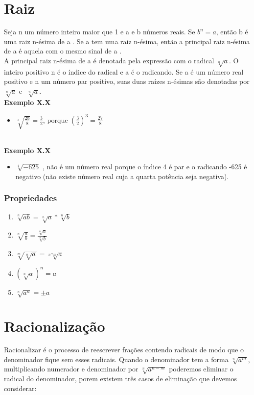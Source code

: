 \documentclass[a4paper,12pt,twoside,BCOR=10mm]{scrbook}
\begin{document}
\begin{titlepage}
\section{Raiz}
Seja n um número inteiro maior que 1 e a e b números reais.
Se $b^{n} = a$, então b é uma raiz n-ésima de a .
Se a tem uma raiz n-ésima, então a principal raiz n-ésima de a é aquela com o mesmo sinal de a .\\
A principal raiz n-ésima de a é denotada pela expressão com o radical $\sqrt[n]{a}$. O inteiro positivo n é o índice do radical e a é o radicando.
Se a é um número real positivo e n um número par positivo, suas duas raízes n-ésimas são denotadas por $\sqrt[n]{a}$ e -$\sqrt[n]{a}$.
\\
\textbf{Exemplo X.X}
\\
\begin{itemize}
\item $\sqrt[3]{\frac{28}{8}} = \frac{3}{2}$, porque $(\frac{3}{2})^{3} = \frac{27}{8}$
\end{itemize}
\\
\textbf{Exemplo X.X}
\\
\begin{itemize}
\item $\sqrt[4]{-625}$ , não é um número real porque o índice 4 é par e o radicando -625 é negativo (não existe número real cuja a quarta potência seja negativa).
\end{itemize}

\subsubsection{Propriedades}
\begin{enumerate}
\item $\sqrt[n]{ab} = \sqrt[n]{a} * \sqrt[n]{b}$
\item $\sqrt[n]{\frac{a}{b}} = \frac{\sqrt[n]{a}}{\sqrt[n]{b}}$
\item $\sqrt[m]{\sqrt[n]{a}} = \sqrt[n*m]{a}$
\item $(\sqrt[n]{a})^{n} = a$
\item $\sqrt[n]{a^{n}} = \pm a$
\end{enumerate}

\section{Racionalização}
Racionalizar é o processo de reescrever frações contendo radicais de modo que o denominador fique sem esses radicais. Quando o denominador tem a forma $\sqrt[n]{a^{m}}$, multiplicando numerador e denominador por $\sqrt[n]{a^{n - m}}$ poderemos eliminar o radical do denominador, porem existem três casos de eliminação que devemos considerar:


\end{titlepage}
\end{document}

